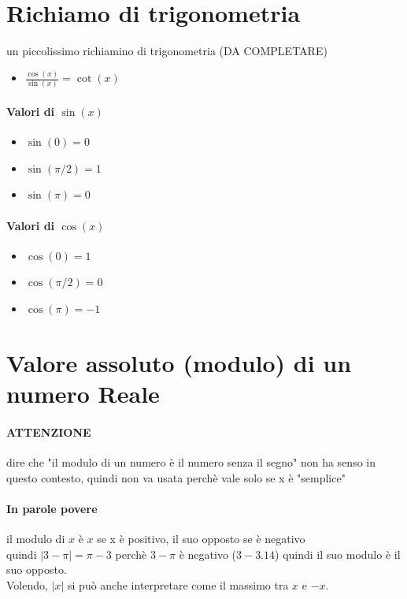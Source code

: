 \documentclass[12pt, a4paper, openany]{book}
\begin{document}
\section{Richiamo di trigonometria}
un piccolissimo richiamino di trigonometria (DA COMPLETARE)
\begin{itemize}
	\item $\frac{\cos(x)}{\sin(x)} = \cot(x)$
\end{itemize}
\paragraph*{Valori di $\sin(x)$}
\begin{itemize}
	\item $\sin(0) = 0$
 \item $\sin(\pi/2) = 1$
 \item $\sin(\pi) = 0$
\end{itemize}
\paragraph*{Valori di $\cos(x)$}
\begin{itemize}
	\item $\cos(0) = 1$
 \item $\cos(\pi/2) = 0$
 \item $\cos(\pi) = -1$
\end{itemize}
\section{Valore assoluto (modulo) di un numero Reale}

\paragraph{ATTENZIONE} dire che "il modulo di un numero è il numero senza il segno" non ha senso in questo contesto, quindi non va usata perchè vale solo se x è "semplice"
\paragraph{In parole povere} il modulo di $x$ è $x$ se x è positivo, il suo opposto se è negativo\\
quindi $|3 - \pi| = \pi - 3$ perchè $3-\pi$ è negativo ($3 - 3.14$) quindi il suo modulo è il suo opposto.
\\Volendo, $|x|$ si può anche interpretare come il massimo tra $x$ e $-x$.
\end{document}
